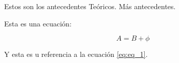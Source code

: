 Estos son los antecedentes Teóricos. Más antecedentes.

Esta es una ecuación:

\begin{equation}
	A = B + \phi
	\label{eq:eq_1}
\end{equation}

Y esta es u referencia a la ecuación \eqref{eq:eq_1}.
